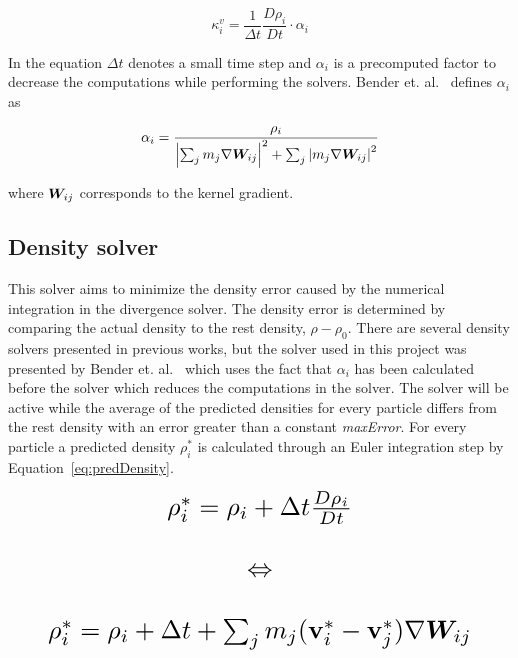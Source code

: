     \begin{equation}\label{eq:kappa}
        \kappa_i^v = \frac{1}{\Delta t} \frac{D\rho_i}{Dt} \cdot \alpha_i
    \end{equation} 

    In the equation $\Delta t$ denotes a small time step and $\alpha_i$ is a precomputed factor to decrease the computations while performing the solvers. Bender et. al.~\cite{bender} defines $\alpha_i$ as

    \begin{equation}\label{eq:alpha}
        \alpha_i = \frac{\rho_i}{\left | \sum_j m_j \nabla \bm{W}_{ij}  \right |^2 + \sum_j \left | m_j \nabla \bm{W}_{ij} \right |^2}
    \end{equation}

    where $\bm{W}_{ij}$ corresponds to the kernel gradient. 

\subsection{Density solver} \label{densitySolver}
    This solver aims to minimize the density error caused by the numerical integration in the divergence solver. The density error is determined by comparing the actual density to the rest density, $\rho - \rho_0$. There are several density solvers presented in previous works, but the solver used in this project was presented by Bender et. al.~\cite{bender} which uses the fact that $\alpha_i$ has been calculated before the solver which reduces the computations in the solver. The solver will be active while the average of the predicted densities for every particle differs from the rest density with an error greater than a constant \textit{maxError}. For every particle a predicted density $\rho_i^*$ is calculated through an Euler integration step by Equation~\ref{eq:predDensity}.

    \begin{equation} \label{eq:predDensity}
        \resizebox{0.88\linewidth}{!}{$
        \begin{matrix}
        \rho_i^* = \rho_i + \Delta t \frac{D\rho_i}{Dt} \\ 
        \\
        \Leftrightarrow \\ 
        \\
        \rho_i^* = \rho_i + \Delta t + \sum_j m_j 
        (\textbf{v}_i^* - \textbf{v}_j^*) \nabla \vect{W}_{ij}
        \end{matrix}
        $}
    \end{equation}

